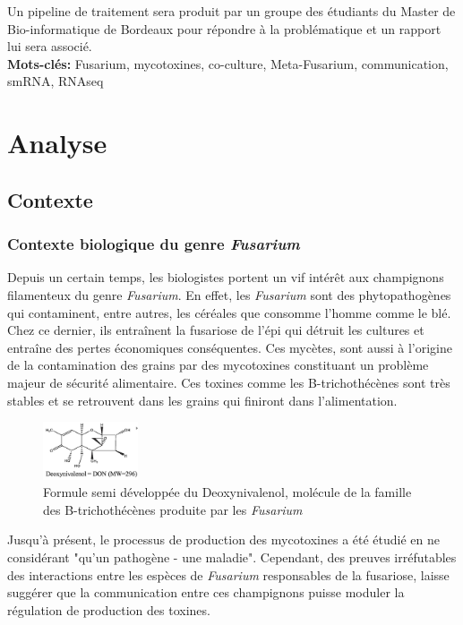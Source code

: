 \documentclass{report}
\begin{document}
Un pipeline de traitement sera produit par un groupe des étudiants du Master de Bio-informatique de Bordeaux pour répondre à la problématique et un rapport lui sera associé. \\

{\bf Mots-clés:} Fusarium, mycotoxines, co-culture, Meta-Fusarium, communication, smRNA, RNAseq

\chapter{Analyse}

\section{Contexte}

\subsection{Contexte biologique du genre \textit{Fusarium}}
Depuis un certain temps, les biologistes portent un vif intérêt aux champignons filamenteux du genre \textit{Fusarium}. En effet, les \textit{Fusarium} sont des phytopathogènes qui contaminent, entre autres, les céréales que consomme l’homme comme le blé. Chez ce dernier, ils entraînent la fusariose de l'épi qui détruit les cultures et entraîne des pertes économiques conséquentes. Ces mycètes, sont aussi à l’origine de la contamination des grains par des mycotoxines constituant un problème majeur de sécurité alimentaire. Ces toxines comme les B-trichothécènes sont très stables et se retrouvent dans les grains qui finiront dans l’alimentation.\\

\begin{figure}
    \centering
    \includegraphics[width=0.25\textwidth]{Images/fig_1.png}
    \caption{Formule semi développée du Deoxynivalenol, molécule de la famille des B-trichothécènes produite par les \textit{Fusarium}\cite{gaballah2023development}}
    \label{fig:mol}
\end{figure}

Jusqu’à présent, le processus de production des mycotoxines a été étudié en ne considérant "qu’un pathogène - une maladie". Cependant, des preuves irréfutables des interactions entre les espèces de \textit{Fusarium} responsables de la fusariose, laisse suggérer que la communication entre ces champignons puisse moduler la régulation de production des toxines.\\
\end{document}
